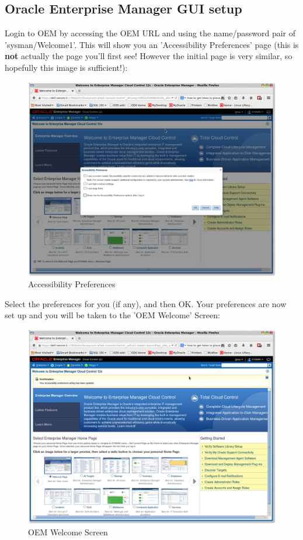 \documentclass[11pt]{article}
\begin{document}
\subsection{Oracle Enterprise Manager GUI setup}
\label{sec-4-2}
Login to OEM by accessing the OEM URL and using the name/password pair of 'sysman/Welcome1'. This will show you an 'Accessibility Preferences' page (this is \textbf{not} actually the page you'll first see! However the initial page is very similar, so hopefully this image is sufficient!):
\begin{figure}[htb]
\centering
\includegraphics[width=.9\linewidth]{images/Accessibility_Preference.png}
\caption{Accessibility Preferences}
\end{figure}
\clearpage
Select the preferences for you (if any), and then OK. Your preferences are now set up and you will be taken to the 'OEM Welcome' Screen:
\begin{figure}[htb]
\centering
\includegraphics[width=.9\linewidth]{images/OEM_Welcome_Screen.png}
\caption{OEM Welcome Screen}
\end{figure}
\end{document}
